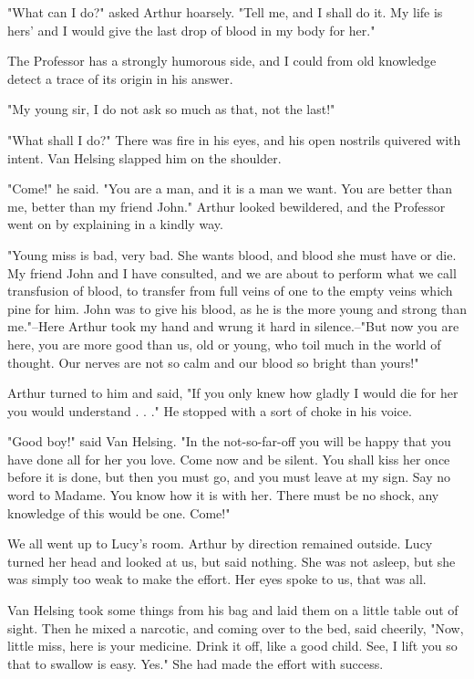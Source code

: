 "What can I do?" asked Arthur hoarsely. "Tell me, and I shall do it. My life is hers' and I would give the last drop of blood in my body for her." 

The Professor has a strongly humorous side, and I could from old knowledge detect a trace of its origin in his answer. 

"My young sir, I do not ask so much as that, not the last!" 

"What shall I do?" There was fire in his eyes, and his open nostrils quivered with intent. Van Helsing slapped him on the shoulder. 

"Come!" he said. "You are a man, and it is a man we want. You are better than me, better than my friend John." Arthur looked bewildered, and the Professor went on by explaining in a kindly way. 

"Young miss is bad, very bad. She wants blood, and blood she must have or die. My friend John and I have consulted, and we are about to perform what we call transfusion of blood, to transfer from full veins of one to the empty veins which pine for him. John was to give his blood, as he is the more young and strong than me."--Here Arthur took my hand and wrung it hard in silence.--"But now you are here, you are more good than us, old or young, who toil much in the world of thought. Our nerves are not so calm and our blood so bright than yours!" 

Arthur turned to him and said, "If you only knew how gladly I would die for her you would understand . . ." He stopped with a sort of choke in his voice. 

"Good boy!" said Van Helsing. "In the not-so-far-off you will be happy that you have done all for her you love. Come now and be silent. You shall kiss her once before it is done, but then you must go, and you must leave at my sign. Say no word to Madame. You know how it is with her. There must be no shock, any knowledge of this would be one. Come!" 

We all went up to Lucy's room. Arthur by direction remained outside. Lucy turned her head and looked at us, but said nothing. She was not asleep, but she was simply too weak to make the effort. Her eyes spoke to us, that was all. 

Van Helsing took some things from his bag and laid them on a little table out of sight. Then he mixed a narcotic, and coming over to the bed, said cheerily, "Now, little miss, here is your medicine. Drink it off, like a good child. See, I lift you so that to swallow is easy. Yes." She had made the effort with success. 

